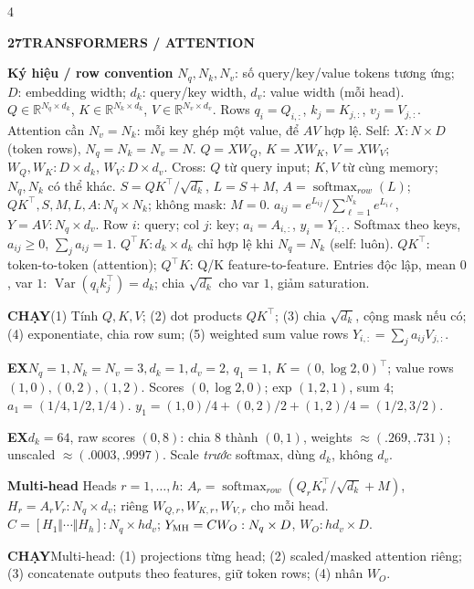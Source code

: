 \documentclass[a4paper]{article}
\newcommand{\topic}[2]{\par\addvspace{.8pt}%
  \begingroup\setlength{\fboxsep}{0.5pt}%
  \noindent\colorbox{structure}{\parbox{\dimexpr\linewidth-2\fboxsep\relax}{%
    \color{white}\fontsize{6.5}{7.1}\selectfont\bfseries #1\enspace #2}}%
  \endgroup\par\nobreak\vspace{.3pt}\nobreak}
\newcommand{\run}[1]{\key{CHẠY}#1}
\newcommand{\key}[1]{\par\textcolor{structure}{\textbf{#1}}\enspace}
\newcommand{\note}[4]{\par\begingroup\setlength{\fboxsep}{0.15pt}%
  \noindent\colorbox{#1}{\parbox{\dimexpr\linewidth-2\fboxsep\relax}{%
    \RaggedRight\textcolor{#2}{\textbf{#3}}\enspace #4}}%
  \endgroup\par}
\newcommand{\ex}[1]{\note{examplebg}{example}{EX}{#1}}
\newcommand{\R}{\mathbb{R}}
\newcommand{\Var}{\operatorname{Var}}
\begin{document}
\begin{multicols*}{4}
\topic{27}{TRANSFORMERS / ATTENTION}
\key{Ký hiệu / row convention}
$N_q,N_k,N_v$: số query/key/value tokens tương ứng; $D$: embedding width;
$d_k$: query/key width, $d_v$: value width (mỗi head).
$Q\in\R^{N_q\times d_k}$, $K\in\R^{N_k\times d_k}$, $V\in\R^{N_v\times d_v}$.
Rows $q_i=Q_{i,:}$, $k_j=K_{j,:}$, $v_j=V_{j,:}$.
Attention cần $N_v=N_k$: mỗi key ghép một value, để $AV$ hợp lệ.
Self: $X:N\times D$ (token rows), $N_q=N_k=N_v=N$.
$Q=XW_Q$, $K=XW_K$, $V=XW_V$;
$W_Q,W_K:D\times d_k$, $W_V:D\times d_v$.
Cross: $Q$ từ query input; $K,V$ từ cùng memory; $N_q,N_k$ có thể khác.
$S=QK^\top/\sqrt{d_k}$, $L=S+M$, $A=\operatorname{softmax}_{row}(L)$;
$QK^\top,S,M,L,A:N_q\times N_k$; không mask: $M=0$.
$a_{ij}=e^{L_{ij}}/\sum_{\ell=1}^{N_k}e^{L_{i\ell}}$,
$Y=AV:N_q\times d_v$.
Row $i$: query; col $j$: key; $a_i=A_{i,:}$, $y_i=Y_{i,:}$.
Softmax theo keys, $a_{ij}\ge0$, $\sum_j a_{ij}=1$.
$Q^\top K:d_k\times d_k$ chỉ hợp lệ khi $N_q=N_k$ (self: luôn).
$QK^\top$: token-to-token (attention); $Q^\top K$: Q/K feature-to-feature.
Entries độc lập, mean $0$, var $1$: $\Var(q_ik_j^\top)=d_k$; chia $\sqrt{d_k}$ cho var $1$, giảm saturation.
\run{(1) Tính $Q,K,V$; (2) dot products $QK^\top$; (3) chia $\sqrt{d_k}$, cộng mask nếu có; (4) exponentiate, chia row sum; (5) weighted sum value rows $Y_{i,:}=\sum_j a_{ij}V_{j,:}$.}
\ex{$N_q=1,N_k=N_v=3,d_k=1,d_v=2$, $q_1=1$, $K=(0,\log2,0)^\top$; value rows $(1,0),(0,2),(1,2)$. Scores $(0,\log2,0)$; exp $(1,2,1)$, sum $4$; $a_1=(1/4,1/2,1/4)$. $y_1=(1,0)/4+(0,2)/2+(1,2)/4=(1/2,3/2)$.}
\ex{$d_k=64$, raw scores $(0,8)$: chia $8$ thành $(0,1)$, weights $\approx(.269,.731)$; unscaled $\approx(.0003,.9997)$. Scale \emph{trước} softmax, dùng $d_k$, không $d_v$.}
\key{Multi-head}
Heads $r=1,\ldots,h$: $A_r=\operatorname{softmax}_{row}(Q_rK_r^\top/\sqrt{d_k}+M)$,
$H_r=A_rV_r:N_q\times d_v$; riêng $W_{Q,r},W_{K,r},W_{V,r}$ cho mỗi head.
$C=[H_1\Vert\cdots\Vert H_h]:N_q\times hd_v$;
$Y_{\rm MH}=CW_O:N_q\times D$, $W_O:hd_v\times D$.
\run{Multi-head: (1) projections từng head; (2) scaled/masked attention riêng; (3) concatenate outputs theo features, giữ token rows; (4) nhân $W_O$.}

\end{multicols*}
\end{document}
